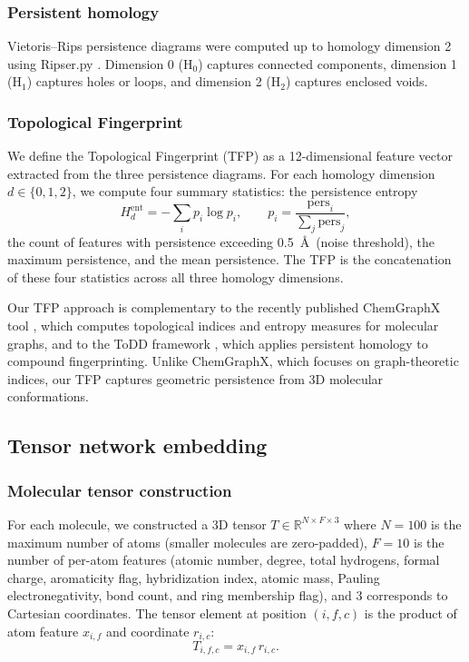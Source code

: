 \documentclass[11pt,a4paper]{article}
\begin{document}
\subsubsection{Persistent homology}

Vietoris--Rips persistence diagrams were computed up to homology dimension 2 using Ripser.py \citep{ripser_2019}. Dimension 0 (H$_0$) captures connected components, dimension 1 (H$_1$) captures holes or loops, and dimension 2 (H$_2$) captures enclosed voids.

\subsubsection{Topological Fingerprint}

We define the Topological Fingerprint (TFP) as a \num{12}-dimensional feature vector extracted from the three persistence diagrams. For each homology dimension $d \in \{0, 1, 2\}$, we compute four summary statistics: the persistence entropy
\begin{equation}
H_d^{\mathrm{ent}} = -\sum_i p_i \log p_i, \qquad p_i = \frac{\mathrm{pers}_i}{\sum_j \mathrm{pers}_j},
\end{equation}
the count of features with persistence exceeding \SI{0.5}{\angstrom}\ (noise threshold), the maximum persistence, and the mean persistence. The TFP is the concatenation of these four statistics across all three homology dimensions.

Our TFP approach is complementary to the recently published ChemGraphX tool \citep{chemgraphx_2026}, which computes topological indices and entropy measures for molecular graphs, and to the ToDD framework \citep{todd_2023}, which applies persistent homology to compound fingerprinting. Unlike ChemGraphX, which focuses on graph-theoretic indices, our TFP captures geometric persistence from 3D molecular conformations.

\subsection{Tensor network embedding}

\subsubsection{Molecular tensor construction}

For each molecule, we constructed a 3D tensor $T \in \mathbb{R}^{N \times F \times 3}$ where $N = 100$ is the maximum number of atoms (smaller molecules are zero-padded), $F = 10$ is the number of per-atom features (atomic number, degree, total hydrogens, formal charge, aromaticity flag, hybridization index, atomic mass, Pauling electronegativity, bond count, and ring membership flag), and 3 corresponds to Cartesian coordinates. The tensor element at position $(i, f, c)$ is the product of atom feature $x_{i,f}$ and coordinate $r_{i,c}$:
\begin{equation}
T_{i,f,c} = x_{i,f} \, r_{i,c}.
\end{equation}
\end{document}
